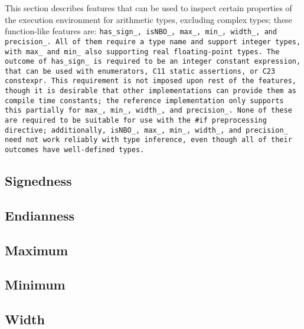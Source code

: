 \def\Subsection#1{\subsection{#1}}

This section describes features that can be used to inspect certain properties
of the execution environment for arithmetic types, excluding complex types;
these function-like features are: \tt{has_sign_}, \tt{isNBO_},
\tt{max_}, \tt{min_}, \tt{width_}, and \tt{precision_}.
All of them require a type name and support integer types,
with \tt{max_} and \tt{min_} also supporting real floating-point types.
The outcome of \tt{has_sign_} is required to be an integer constant expression,
that can be used with enumerators, C11 static assertions, or C23 \tt{constexpr}.
This requirement is not imposed upon rest of the features, though it is
desirable that other implementations can provide them as compile time constants;
the reference implementation only supports this partially
for \tt{max_}, \tt{min_}, \tt{width_}, and \tt{precision_}.
None of these are required to be suitable for use with the \tt{#if}
preprocessing directive; additionally, \tt{isNBO_}, \tt{max_}, \tt{min_},
\tt{width_}, and \tt{precision_} need not work reliably with type inference,
even though all of their outcomes have well-defined types.

\Subsection{Signedness}

\Subsection{Endianness}

\pagebreak

\Subsection{Maximum}

\Subsection{Minimum}

\Subsection{Width}
